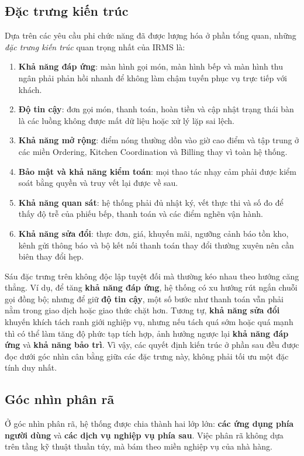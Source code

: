 \documentclass[11pt,a4paper]{article}
\begin{document}
\subsection{Đặc trưng kiến trúc}
Dựa trên các yêu cầu phi chức năng đã được lượng hóa ở phần tổng quan, những \emph{đặc trưng kiến trúc} quan trọng nhất của IRMS là:
\begin{enumerate}
  \item \textbf{Khả năng đáp ứng}: màn hình gọi món, màn hình bếp và màn hình thu ngân phải phản hồi nhanh để không làm chậm tuyến phục vụ trực tiếp với khách.
  \item \textbf{Độ tin cậy}: đơn gọi món, thanh toán, hoàn tiền và cập nhật trạng thái bàn là các luồng không được mất dữ liệu hoặc xử lý lặp sai lệch.
  \item \textbf{Khả năng mở rộng}: điểm nóng thường dồn vào giờ cao điểm và tập trung ở các miền \textsf{Ordering}, \textsf{Kitchen Coordination} và \textsf{Billing} thay vì toàn hệ thống.
  \item \textbf{Bảo mật và khả năng kiểm toán}: mọi thao tác nhạy cảm phải được kiểm soát bằng quyền và truy vết lại được về sau.
  \item \textbf{Khả năng quan sát}: hệ thống phải đủ nhật ký, vết thực thi và số đo để thấy độ trễ của phiếu bếp, thanh toán và các điểm nghẽn vận hành.
  \item \textbf{Khả năng sửa đổi}: thực đơn, giá, khuyến mãi, ngưỡng cảnh báo tồn kho, kênh gửi thông báo và bộ kết nối thanh toán thay đổi thường xuyên nên cần biên thay đổi hẹp.
\end{enumerate}

Sáu đặc trưng trên không độc lập tuyệt đối mà thường kéo nhau theo hướng căng thẳng.
Ví dụ, để tăng \textbf{khả năng đáp ứng}, hệ thống có xu hướng rút ngắn chuỗi gọi đồng bộ;
nhưng để giữ \textbf{độ tin cậy}, một số bước như thanh toán vẫn phải nằm trong giao dịch hoặc giao thức chặt hơn.
Tương tự, \textbf{khả năng sửa đổi} khuyến khích tách ranh giới nghiệp vụ,
nhưng nếu tách quá sớm hoặc quá mạnh thì có thể làm tăng độ phức tạp tích hợp,
ảnh hưởng ngược lại \textbf{khả năng đáp ứng} và \textbf{khả năng bảo trì}.
Vì vậy, các quyết định kiến trúc ở phần sau đều được đọc dưới góc nhìn cân bằng giữa các đặc trưng này,
không phải tối ưu một đặc tính duy nhất.

\subsection{Góc nhìn phân rã}
Ở góc nhìn phân rã, hệ thống được chia thành hai lớp lớn:
\textbf{các ứng dụng phía người dùng} và \textbf{các dịch vụ nghiệp vụ phía sau}.
Việc phân rã không dựa trên tầng kỹ thuật thuần túy, mà bám theo miền nghiệp vụ của nhà hàng.
\end{document}
